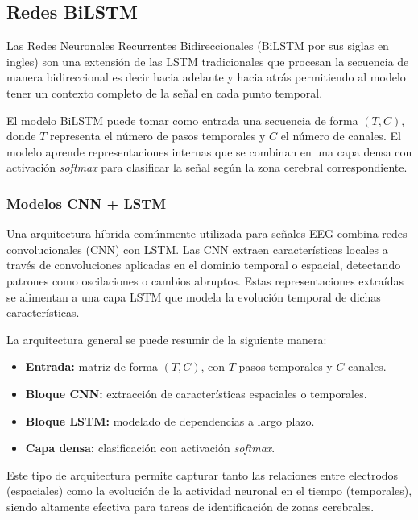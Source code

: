 \subsection{Redes BiLSTM}

Las Redes Neuronales Recurrentes Bidireccionales (BiLSTM por sus siglas en ingles) son una extensión de las LSTM tradicionales que procesan la secuencia de manera bidireccional es decir hacia adelante y hacia atrás permitiendo al modelo tener un contexto completo de la señal en cada punto temporal.

El modelo BiLSTM puede tomar como entrada una secuencia de forma $(T, C)$, donde $T$ representa el número de pasos temporales y $C$ el número de canales. El modelo aprende representaciones internas que se combinan en una capa densa con activación \textit{softmax} para clasificar la señal según la zona cerebral correspondiente.

\subsubsection{Modelos CNN + LSTM}

Una arquitectura híbrida comúnmente utilizada para señales EEG combina redes convolucionales (CNN) con LSTM. Las CNN extraen características locales a través de convoluciones aplicadas en el dominio temporal o espacial, detectando patrones como oscilaciones o cambios abruptos. Estas representaciones extraídas se alimentan a una capa LSTM que modela la evolución temporal de dichas características.

La arquitectura general se puede resumir de la siguiente manera:

\begin{itemize}
    \item \textbf{Entrada:} matriz de forma $(T, C)$, con $T$ pasos temporales y $C$ canales.
    \item \textbf{Bloque CNN:} extracción de características espaciales o temporales.
    \item \textbf{Bloque LSTM:} modelado de dependencias a largo plazo.
    \item \textbf{Capa densa:} clasificación con activación \textit{softmax}.
\end{itemize}

Este tipo de arquitectura permite capturar tanto las relaciones entre electrodos (espaciales) como la evolución de la actividad neuronal en el tiempo (temporales), siendo altamente efectiva para tareas de identificación de zonas cerebrales.

